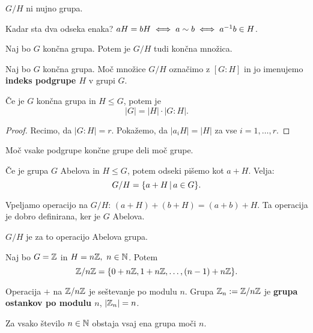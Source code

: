 \begin{opomba}
    $G/H$ ni nujno grupa.
\end{opomba}

\begin{opomba}
    Kadar sta dva odseka enaka? $aH = bH \iff a \sim b \iff a^{-1}b \in H$.
\end{opomba}

\begin{opomba}
    Naj bo $G$ končna grupa. Potem je $G/H$ tudi končna množica.
\end{opomba}

\begin{definicija}
    Naj bo $G$ končna grupa. Moč množice $G/H$ označimo z $[G:H]$ in jo imenujemo \textbf{indeks podgrupe $H$} v grupi $G$.
\end{definicija}

\begin{izrek}
    Če je $G$ končna grupa in $H \leq G$, potem je 
    $$|G| = |H| \cdot |G:H|.$$
\end{izrek}

\begin{proof}
    Recimo, da $|G:H| = r$. Pokažemo, da $|a_iH| = |H|$ za vse $i = 1, \ldots, r$.
\end{proof}

\begin{posledica}
    Moč vsake podgrupe končne grupe deli moč grupe.
\end{posledica}

\begin{opomba}
    Če je grupa $G$ Abelova in $H \leq G$, potem odseki pišemo kot $a + H$. Velja: $$G/H = \{a+H \,|\, a \in G\}.$$

    Vpeljamo operacijo na $G/H$: $(a+H) + (b+H) = (a + b) + H$. Ta operacija je dobro definirana, ker je $G$ Abelova.
\end{opomba}

\begin{trditev}
    $G/H$ je za to operacijo Abelova grupa.
\end{trditev}

\begin{primer}
    Naj bo $G = \mathbb{Z}$ in $H = n\mathbb{Z}, \ n \in \mathbb{N}$. Potem $$\mathbb{Z}/{n\mathbb{Z}} = \{0 + n\mathbb{Z}, 1 + n\mathbb{Z}, \ldots, (n-1) + n\mathbb{Z}\}.$$

    Operacija $+$ na $\mathbb{Z}/{n\mathbb{Z}}$ je seštevanje po modulu $n$. Grupa $\mathbb{Z}_n := \mathbb{Z}/{n\mathbb{Z}}$ je \textbf{grupa ostankov po modulu $n$}, $|\mathbb{Z}_n| = n$.
\end{primer}
\begin{posledica}
    Za vsako število $n \in \mathbb{N}$ obstaja vsaj ena grupa moči $n$.
\end{posledica}

